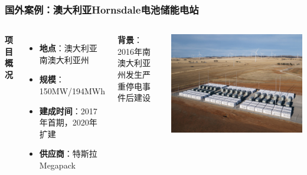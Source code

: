 \documentclass[aspectratio=169]{beamer}
\begin{document}
\begin{frame}
    \frametitle{国外案例：澳大利亚Hornsdale电池储能电站}
    \begin{columns}
        \textbf{项目概况}
        \begin{itemize}
            \item \textbf{地点}：澳大利亚南澳大利亚州
            \item \textbf{规模}：150MW/194MWh
            \item \textbf{建成时间}：2017年首期，2020年扩建
            \item \textbf{供应商}：特斯拉Megapack
        \end{itemize}
        
        \textbf{背景}：2016年南澳大利亚州发生严重停电事件后建设
        
        \centering
        \includegraphics[width=\textwidth]{fig/Hornsdale电池储能电站.jpg}
    \end{columns}
\end{frame}
\end{document}
